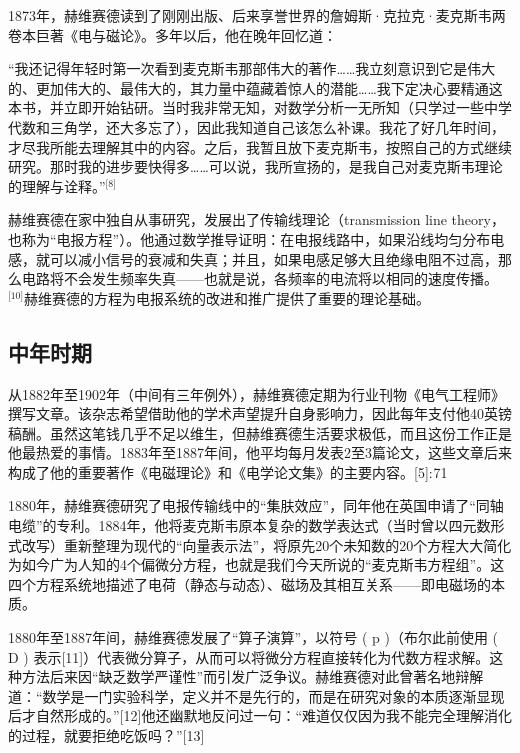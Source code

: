 1873年，赫维赛德读到了刚刚出版、后来享誉世界的詹姆斯·克拉克·麦克斯韦两卷本巨著《电与磁论》。多年以后，他在晚年回忆道：

“我还记得年轻时第一次看到麦克斯韦那部伟大的著作……我立刻意识到它是伟大的、更加伟大的、最伟大的，其力量中蕴藏着惊人的潜能……我下定决心要精通这本书，并立即开始钻研。当时我非常无知，对数学分析一无所知（只学过一些中学代数和三角学，还大多忘了），因此我知道自己该怎么补课。我花了好几年时间，才尽我所能去理解其中的内容。之后，我暂且放下麦克斯韦，按照自己的方式继续研究。那时我的进步要快得多……可以说，我所宣扬的，是我自己对麦克斯韦理论的理解与诠释。”\(^\text{[8]}\)

赫维赛德在家中独自从事研究，发展出了传输线理论（transmission line theory，也称为“电报方程”）。他通过数学推导证明：在电报线路中，如果沿线均匀分布电感，就可以减小信号的衰减和失真；并且，如果电感足够大且绝缘电阻不过高，那么电路将不会发生频率失真——也就是说，各频率的电流将以相同的速度传播。\(^\text{[10]}\)赫维赛德的方程为电报系统的改进和推广提供了重要的理论基础。
\subsection{中年时期}
从1882年至1902年（中间有三年例外），赫维赛德定期为行业刊物《电气工程师》撰写文章。该杂志希望借助他的学术声望提升自身影响力，因此每年支付他40英镑稿酬。虽然这笔钱几乎不足以维生，但赫维赛德生活要求极低，而且这份工作正是他最热爱的事情。1883年至1887年间，他平均每月发表2至3篇论文，这些文章后来构成了他的重要著作《电磁理论》和《电学论文集》的主要内容。[5]: 71 

1880年，赫维赛德研究了电报传输线中的“集肤效应”，同年他在英国申请了“同轴电缆”的专利。1884年，他将麦克斯韦原本复杂的数学表达式（当时曾以四元数形式改写）重新整理为现代的“向量表示法”，将原先20个未知数的20个方程大大简化为如今广为人知的4个偏微分方程，也就是我们今天所说的“麦克斯韦方程组”。这四个方程系统地描述了电荷（静态与动态）、磁场及其相互关系——即电磁场的本质。

1880年至1887年间，赫维赛德发展了“算子演算”，以符号 ( p )（布尔此前使用 ( D ) 表示[11]）代表微分算子，从而可以将微分方程直接转化为代数方程求解。这种方法后来因“缺乏数学严谨性”而引发广泛争议。赫维赛德对此曾著名地辩解道：“数学是一门实验科学，定义并不是先行的，而是在研究对象的本质逐渐显现后才自然形成的。”[12]他还幽默地反问过一句：“难道仅仅因为我不能完全理解消化的过程，就要拒绝吃饭吗？”[13]
